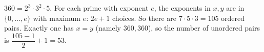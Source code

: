 $360=2^3\cdot3^2\cdot5$. For each prime with exponent $e$, the exponents in $x,y$ are in $\{0,\dots,e\}$ with maximum $e$: $2e+1$ choices. So there are $7\cdot5\cdot3=105$ ordered pairs. Exactly one has $x=y$ (namely $360,360$), so the number of unordered pairs is $\dfrac{105-1}2+1=\boxed{53}$.

